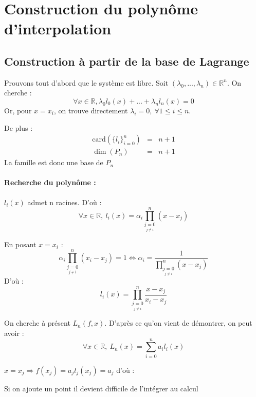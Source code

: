 \section{Construction du polynôme d'interpolation}
\subsection{Construction à partir de la base de Lagrange}

\begin{dem}
Prouvons tout d'abord que le système est libre. Soit $(\lambda_0,...,\lambda_n)\in\mathbb{R}^n$. On cherche :
\[\forall x\in \mathbb{R}, \lambda_0l_0(x) + ... + \lambda_n l_n(x) = 0\]
Or, pour $x=x_i$, on trouve directement $\lambda_i=0,\ \forall 1\leq i\leq n$.

De plus :  \begin{eqnarray*}
\text{card}(\{l_i\}_{i=0}^n) &=& n+1 \\
\dim (P_n) &=& n+1
\end{eqnarray*}
La famille est donc une base de $P_n$
\end{dem}

\paragraph{Recherche du polynôme : \\}
$l_i(x)$ admet n racines. D'où : \[\forall x\in \mathbb{R},\  l_i(x)=\alpha_i \prod_{\underset{j\neq i}{j=0}}^n (x-x_j)\]

En posant $x=x_i$ : \[\alpha_i \prod_{\underset{j\neq i}{j=0}}^n (x_i-x_j)=1 \Leftrightarrow \alpha_i = \frac{1}{\prod_{\underset{j\neq i}{j=0}}^n (x-x_j)}\]
D'où :
\[l_i(x)=\prod_{\underset{j\neq i}{j=0}}^n \frac{x-x_j}{x_i-x_j}\]

On cherche à présent $L_n(f,x)$. D'après ce qu'on vient de démontrer, on peut avoir : 
\[\forall x\in \mathbb{R},\ L_n(x)=\sum_{i=0}^n a_i l_i(x)\]

$x=x_j \Rightarrow f(x_j)=a_jl_j(x_j)=a_j$ d'où :

\bigskip
{}

\begin{rmq}
Si on ajoute un point il devient difficile de l'intégrer au calcul
\end{rmq}

